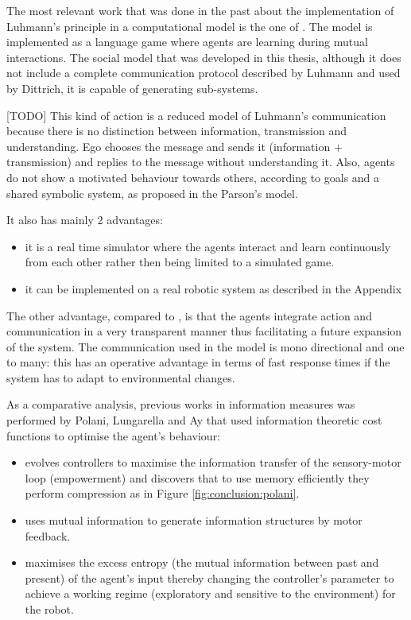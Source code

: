 The most relevant work that was done in the past about the implementation
of Luhmann's principle in a computational model is the one of \citet{SocialOrderScalability}.
The model is implemented as a language game where agents are learning
during mutual interactions.
The social model that was developed in this thesis, although it does not include
 a complete communication protocol described by Luhmann and used by Dittrich,
it is capable of generating sub-systems.

[TODO]
This kind of action is a reduced model of Luhmann's communication because there 
is no distinction between information, transmission and understanding.
Ego chooses the message and sends it (information $+$ transmission) and
replies to the message without understanding it.
Also, agents do not show a motivated behaviour towards others, according
to goals and a shared symbolic system, as proposed in the Parson's model.

It also has mainly 2 advantages:
\begin{itemize}
 \item it is a real time simulator where the agents interact and learn continuously
 from each other rather then being limited to a simulated game.
 \item it can be implemented on a real robotic system as described in the Appendix 
\end{itemize}

The other advantage, compared to \citet{SocialOrderScalability}, is that
the agents integrate action and communication in a very transparent manner
thus facilitating a future expansion of the system.
The communication used in the model is mono directional and one to many:
this has an operative advantage in terms of fast response times if the
system has to adapt to environmental changes.

As a comparative analysis, previous works in information measures was performed by Polani,
 Lungarella and Ay that used information theoretic cost functions to optimise the agent's behaviour:
\begin{itemize}
\item \citet{organizationInfo} evolves controllers to maximise the information transfer
of the sensory-motor loop (empowerment) and discovers that to use memory efficiently they perform 
compression as in Figure \ref{fig:conclusion:polani}.
\item \citet{LungarellaInformation} uses mutual information to generate information structures by motor feedback.
\item \citet{AyClosedLoop} maximises the excess entropy (the mutual information between past and present) 
 of the agent's input thereby changing the controller's parameter to achieve a 
 working regime (exploratory and sensitive to the environment) for the robot.
\end{itemize}

